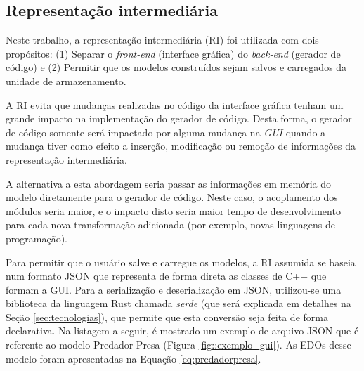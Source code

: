 \documentclass[
	12pt,				%
	openright,			%
	oneside,			%
	a4paper,			%
	main=brazil,
	english,			%
	]{ufsj-abntex2}
\begin{document}
\subsection{Representação intermediária}\label{subsection:RI}

Neste trabalho, a representação intermediária (RI) foi utilizada com dois propósitos: (1) Separar o \textit{front-end} (interface gráfica) do \textit{back-end} (gerador de código) e (2) Permitir que os modelos construídos sejam salvos e carregados da unidade de armazenamento.

A RI evita que mudanças realizadas no código da interface gráfica tenham um grande impacto na implementação do gerador de código. Desta forma, o gerador de código somente será impactado por alguma mudança na \textit{GUI} quando a mudança tiver como efeito a inserção, modificação ou remoção de informações da representação intermediária.

A alternativa a esta abordagem seria passar as informações em memória do modelo diretamente para o gerador de código. Neste caso, o acoplamento dos módulos seria maior, e o impacto disto seria maior tempo de desenvolvimento para cada nova transformação adicionada (por exemplo, novas linguagens de programação).

Para permitir que o usuário salve e carregue os modelos, a RI assumida se baseia num formato JSON que representa de forma direta as classes de C++ que formam a GUI. Para a serialização e deserialização em JSON, utilizou-se uma biblioteca da linguagem Rust chamada \textit{serde} (que será explicada em detalhes na Seção \ref{sec:tecnologias}), que permite que esta conversão seja feita de forma declarativa. Na listagem a seguir, é mostrado um exemplo de arquivo JSON que é referente ao modelo Predador-Presa (Figura \ref{fig::exemplo_gui}). As EDOs desse modelo foram apresentadas na Equação \ref{eq:predadorpresa}. 



\end{document}
